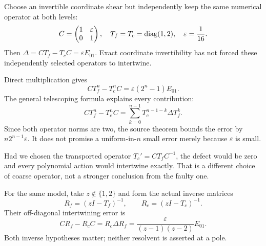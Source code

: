 
Choose an invertible coordinate shear but independently keep the same numerical operator at both levels:
\[
C=\begin{pmatrix}1&\varepsilon\\0&1\end{pmatrix},\quad
T_f=T_c=\operatorname{diag}(1,2),\quad \varepsilon=\frac1{16}.
\]
Then $\Delta=CT_f-T_cC=\varepsilon E_{01}$. Exact coordinate invertibility has not forced these independently selected operators to intertwine.


Direct multiplication gives
\[
CT_f^n-T_c^nC=\varepsilon(2^n-1)E_{01}.
\]
The general telescoping formula explains every contribution:
\[
CT_f^n-T_c^nC
=\sum_{k=0}^{n-1}T_c^{n-1-k}\Delta T_f^k.
\]
Since both operator norms are two, the source theorem bounds the error by $n2^{n-1}\varepsilon$. It does not promise a uniform-in-$n$ small error merely because $\varepsilon$ is small.

Had we chosen the transported operator $T_c'=CT_fC^{-1}$, the defect would be zero and every polynomial action would intertwine exactly. That is a different choice of coarse operator, not a stronger conclusion from the faulty one.


For the same model, take $z\notin\{1,2\}$ and form the actual inverse matrices
\[
R_f=(zI-T_f)^{-1},\qquad R_c=(zI-T_c)^{-1}.
\]
Their off-diagonal intertwining error is
\[
CR_f-R_cC=R_c\Delta R_f
=\frac{\varepsilon}{(z-1)(z-2)}E_{01}.
\]
Both inverse hypotheses matter; neither resolvent is asserted at a pole.


